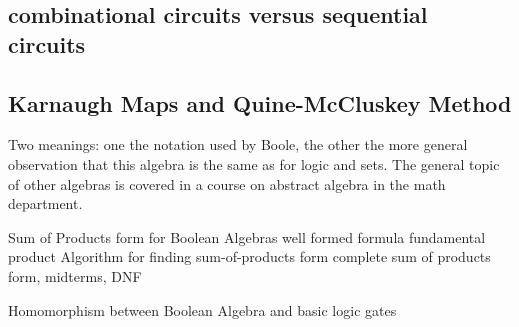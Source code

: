 	\subsection {combinational circuits versus sequential circuits}
    \subsection {Karnaugh Maps and Quine-McCluskey Method}

Two meanings: one the notation used by Boole, the other the more general observation that this algebra is the same as for logic and sets. The general topic of other algebras is covered in a course on abstract algebra in the math department. 

Sum of Products form for Boolean Algebras
well formed formula
fundamental product
Algorithm for finding sum-of-products form
complete sum of products form, midterms, DNF

Homomorphism between Boolean Algebra and basic logic gates
